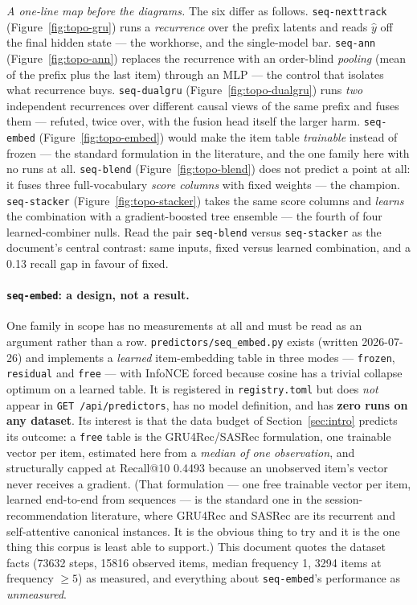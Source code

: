 \documentclass[11pt]{article}
\begin{document}
\emph{A one-line map before the diagrams.} The six differ as follows.
\texttt{seq-nexttrack} (Figure~\ref{fig:topo-gru}) runs a \emph{recurrence} over
the prefix latents and reads $\hat{y}$ off the final hidden state --- the
workhorse, and the single-model bar. \texttt{seq-ann}
(Figure~\ref{fig:topo-ann}) replaces the recurrence with an order-blind
\emph{pooling} (mean of the prefix plus the last item) through an MLP --- the
control that isolates what recurrence buys. \texttt{seq-dualgru}
(Figure~\ref{fig:topo-dualgru}) runs \emph{two} independent recurrences over
different causal views of the same prefix and fuses them --- refuted, twice over,
with the fusion head itself the larger harm. \texttt{seq-embed}
(Figure~\ref{fig:topo-embed}) would make the item table \emph{trainable} instead
of frozen --- the standard formulation in the literature, and the one family here
with no runs at all. \texttt{seq-blend} (Figure~\ref{fig:topo-blend}) does not
predict a point at all: it fuses three full-vocabulary \emph{score columns} with
fixed weights --- the champion. \texttt{seq-stacker}
(Figure~\ref{fig:topo-stacker}) takes the same score columns and \emph{learns}
the combination with a gradient-boosted tree ensemble --- the fourth of four
learned-combiner nulls. Read the pair \texttt{seq-blend} versus
\texttt{seq-stacker} as the document's central contrast: same inputs, fixed
versus learned combination, and a \num{0.13} recall gap in favour of fixed.



\paragraph{\texttt{seq-embed}: a design, not a result.} One family in scope has
no measurements at all and must be read as an argument rather than a row.
\texttt{predictors/seq\_embed.py} exists (written 2026-07-26) and implements a
\emph{learned} item-embedding table in three modes --- \texttt{frozen},
\texttt{residual} and \texttt{free} --- with InfoNCE forced because cosine has a
trivial collapse optimum on a learned table. It is registered in
\texttt{registry.toml} but does \emph{not} appear in
\texttt{GET /api/predictors}, has no model definition, and has \textbf{zero runs
on any dataset}. Its interest is that the data budget of
Section~\ref{sec:intro} predicts its outcome: a \texttt{free} table is the
GRU4Rec/SASRec formulation, one trainable vector per item, estimated here from a
\emph{median of one observation}, and structurally capped at Recall@10
\num{0.4493} because an unobserved item's vector never receives a gradient. (That
formulation --- one free trainable vector per item, learned end-to-end from
sequences --- is the standard one in the session-recommendation literature, where
GRU4Rec and SASRec are its recurrent and self-attentive canonical instances. It
is the obvious thing to try and it is the one thing this corpus is least able to
support.) This
document quotes the dataset facts (\num{73632} steps, \num{15816} observed
items, median frequency \num{1}, \num{3294} items at frequency $\ge5$) as
measured, and everything about \texttt{seq-embed}'s performance as
\emph{unmeasured}.
\end{document}
